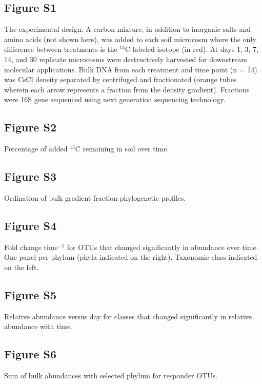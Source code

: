 \subsection{Figure S1}
The experimental design.  A carbon mixture, in addition to inorganic salts and amino acids (not shown here), was added to each soil microcosm where the only difference between treatments is the $^{13}$C-labeled isotope (in red). At days 1, 3, 7, 14, and 30 replicate microcosms were destructively harvested for downstream molecular applications. Bulk DNA from each treatment and time point (n = 14) was CsCl density separated by centrifuged and fractionated (orange tubes wherein each arrow represents a fraction from the density gradient). Fractions were 16S gene sequenced using next generation sequencing technology.\subsection{Figure S2}
Percentage of added $^{13}$C remaining in soil over time.     \subsection{Figure S3}
Ordination of bulk gradient fraction phylogenetic profiles.\subsection{Figure S4}
Fold change time$^{-1}$ for OTUs that changed significantly in abundance over time. One panel per phylum (phyla indicated on the right). Taxonomic class indicated on the left.\subsection{Figure S5}
Relative abundance versus day for classes that changed significantly in relative abundance with time.\subsection{Figure S6}
Sum of bulk abundances with selected phylum for responder OTUs.
